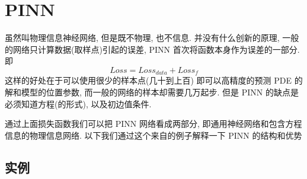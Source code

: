 \documentclass[lang=cn,a4paper,newtx]{elegantpaper}
\begin{document}
\section{PINN}
虽然叫物理信息神经网络, 但是既不物理, 也不信息. 并没有什么创新的原理, 一般的网络只计算数据(取样点)引起的误差, PINN 首次将函数本身作为误差的一部分. 即
\begin{equation}
    Loss = Loss_{data} + Loss_{f}
\end{equation}
这样的好处在于可以使用很少的样本点(几十到上百) 即可以高精度的预测 PDE 的解和模型的位置参数, 而一般的网络的样本却需要几万起步. 但是 PINN 的缺点是必须知道方程(的形式), 以及初边值条件. 

通过上面损失函数我们可以把 PINN 网络看成两部分, 即通用神经网络和包含方程信息的物理信息网络. 以下我们通过这个来自\cite{PINN}的例子解释一下 PINN 的结构和优势
\subsection{实例}
\end{document}
